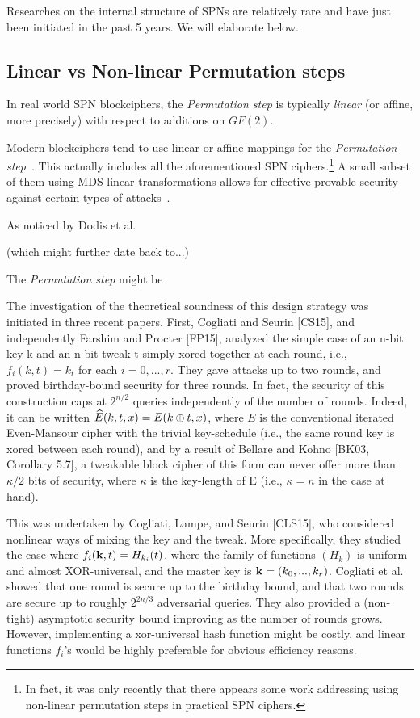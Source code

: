 Researches on the internal structure of SPNs are relatively rare and have just been initiated in the past 5 years. We will elaborate below.




\subsection{Linear vs Non-linear Permutation steps}


In real world SPN blockciphers, the {\it Permutation step} is typically {\it linear} (or affine, more precisely) with respect to additions on $GF(2)$.


Modern blockciphers tend to use linear or affine mappings for the {\it Permutation step}~\cite{DBLP:reference/crypt/Biryukov11aa}. This actually includes all the aforementioned SPN ciphers.\footnote{In fact, it was only recently that
there appears some work addressing using non-linear permutation steps in practical SPN ciphers.} A small subset of them using MDS linear transformations allows for effective provable security against certain types of attacks~\cite{IMA:DaeRij01,AC:PSCYL02,FSE:PSLL03,miles2015substitution,EC:SLGRL16}.




As noticed by Dodis et al.

(which might further date back to...)

The {\it Permutation step} might be


The investigation of the theoretical soundness of this design strategy was initiated in three
recent papers. First, Cogliati and Seurin [CS15], and independently Farshim and Procter [FP15],
analyzed the simple case of an n-bit key k and an n-bit tweak t simply xored together at each
round, i.e., $f_i(k,t) = k_t$ for each $i = 0, . . . , r$. They gave attacks up to two rounds, and proved
birthday-bound security for three rounds. In fact, the security of this construction caps at $2^{n/2}$
queries independently of the number of rounds. Indeed, it can be written $\widehat{E}(k, t, x) = E(k\oplus t, x)$,
where $E$ is the conventional iterated Even-Mansour cipher with the trivial key-schedule (i.e.,
the same round key is xored between each round), and by a result of Bellare and Kohno [BK03,
Corollary 5.7], a tweakable block cipher of this form can never offer more than $\kappa/2$ bits of
security, where $\kappa$ is the key-length of E (i.e., $\kappa = n$ in the case at hand).




This was undertaken by Cogliati, Lampe, and Seurin [CLS15], who considered nonlinear
ways of mixing the key and the tweak. More specifically, they studied the case where $f_i(\mathbf{k}, t) =
H_{k_i}(t)$, where the family of functions $(H_k)$ is uniform and almost XOR-universal, and the
master key is $\mathbf{k} = (k_0, . . . , k_r)$. Cogliati et al. showed that one round is secure up to the birthday bound,
and that two rounds are secure up to roughly $2^{2n/3}$ adversarial queries. They also provided a
(non-tight) asymptotic security bound improving as the number of rounds grows. However,
implementing a xor-universal hash function might be costly, and linear functions $f_i$'s would be highly preferable for obvious efficiency reasons.




